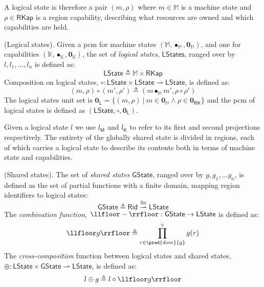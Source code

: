 A logical state is therefore a pair $(m, \rho)$ where $m \in \mathbb{M}$ is a machine state and $\rho \in \mathsf{RKap}$ is a region capability, describing what resources are owned and which capabilities are held.
\begin{defn}
	(Logical states).
	Given a pcm for machine states $(\mathbb{M}, \bullet_\mathbb{M}, \mathbf{0}_\mathbb{M})$, and one for capabilities $(\mathbb{K}, \bullet_\mathbb{K}, \mathbf{0}_\mathbb{K})$, the set of \emph{logical states}, $\mathsf{LStates}$, ranged over by $l, l_1, \ldots, l_n$ is defined as:
	\[
		\mathsf{LState} \triangleq \mathbb{M} \times \mathsf{RKap}
	\]
	Composition on logical states, $\circ : \mathsf{LState} \times \mathsf{LState} \rightharpoonup \mathsf{LState}$, is defined as:
	\[
		(m, \rho) \circ (m', \rho') \triangleq (m \bullet_\mathbb{M} m', \rho \circ \rho')
	\]
	The logical states unit set is $\mathbf{0}_\mathsf{L} = \{ (m, \rho)\ |\ m \in \mathbf{0}_\mathbb{M} \land \rho \in \mathbf{0}_\mathsf{RK} \}$ and the pcm of logical states is defined as $(\mathsf{LState}, \circ, \mathbf{0}_\mathsf{L})$.
\end{defn}

Given a logical state $l$ we use $l_\mathsf{M}$ and $l_\mathsf{K}$ to refer to its first and second projections respectively. The entirety of the globally shared state is divided in regions, each of which  carries a logical state to describe its contents both in terms of machine state and capabilities.

\begin{defn}
	(Shared states).
	The set of \emph{shared states} $\mathsf{GState}$, ranged over by $g, g_1, \ldots g_n$, is defined as the set of partial functions with a finite domain, mapping region identifiers to logical states:
	\[
		\mathsf{GState} \triangleq \mathsf{Rid} \overset{\text{fin}}{\rightharpoonup} \mathsf{LState}
	\]
	The \emph{combination function}, $\llfloor - \rrfloor : \mathsf{GState} \rightarrow \mathsf{LState}$ is defined as:
	\[
		\llfloor g \rrfloor \triangleq \prod^{\circ}_{r \in \pred{dom}{g}} g(r)
	\]
	The \textit{cross-composition} function between logical states and shared states, $\oplus : \mathsf{LState} \times \mathsf{GState} \rightharpoonup \mathsf{LState}$, is defined as:
	\[
		l \oplus g \triangleq l \circ \llfloor g \rrfloor
	\]
\end{defn}


